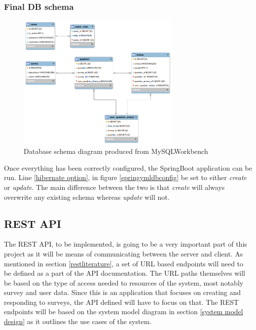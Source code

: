 \clearpage
\subsubsection{Final DB schema}

\begin{figure}[ht]
    \centering
    \includegraphics[width=300px]{images/db_schema.png}
    \caption{Database schema diagram produced from MySQLWorkbench}
    \label{sqldbschamfull}
\end{figure}

Once everything has been correctly configured, the SpringBoot application can be run.
Line \ref{hibernate option}, in figure \ref{springymldbconfig} be set to either \textit{create} or \textit{update}.
The main difference between the two is that \textit{create} will always overwrite any existing schema whereas \textit{update} will not.



\subsection{REST API}

The REST API, to be implemented, is going to be a very important part of this project as it will be means of communicating between
the server and client. 
As mentioned in section \ref{restliterature}, a set of URL based endpoints will need to be defined as a part of the API 
documentation.
The URL paths themselves will be based on the type of access needed to resources of the system, most notably survey and user data.
Since this is an application that focuses on creating and responding to surveys, the API defined will have to focus on that.
The REST endpoints will be based on the system model diagram in section \ref{system model design} as it outlines the use cases 
of the system.

